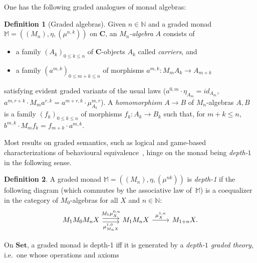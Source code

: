 \documentclass[11pt,a4paper]{amsart}
\theoremstyle{plain}
\newcommand{\id}{\mathit{id}}
\numberwithin{equation}{section}
\newcommand{\Nat}{{\mathbb{N}}}
\newcommand{\monad}{{\mathbb{M}}}
\newcommand{\Set}{\mathbf{Set}}
\newcommand{\+}[1]{\mathcal{#1}\xspace}
\newcommand{\BC}{\mathbf{C}}
\theoremstyle{definition}
\newtheorem{defn}[defn]{Definition}
\begin{document}
\noindent One has the following graded analogues of monad algebras:
\begin{defn}[Graded algebras]
  Given \(n \in \Nat\) and a graded monad
  \(\monad=((M_n), \eta, (\mu^{n, k}))\) on \(\BC\), an
  \emph{\(M_n\)-algebra} \(A\) consists of
    \begin{itemize}
        \item a family \((A_k)_{0 \le k \le n}\) of $\BC$-objects \(A_k\) called \emph{carriers}, and
        \item a family \((a^{m, k})_{0 \le m + k \le n}\) of morphisms \(a^{m, k}: M_m A_k \to A_{m + k}\)
    \end{itemize}
    satisfying evident graded variants of the usual laws
    (\(a^{0, m} \cdot \eta_{A_m} = \id_{A_m}\),
    \(a^{m, r + k} \cdot M_m a^{r, k} = a^{m + r, k} \cdot \mu^{m,
      r}_{A_k}\)).
    A \emph{homomorphism} $A\to B$ of \(M_n\)-algebras \(A, B\) is a
    family \((f_k)_{0 \le k \le n}\) of morphisms
    \(f_k\colon A_k \to B_k\) such that, for \(m + k \le n\),
    \(b^{m, k} \cdot M_m f_k = f_{m + k} \cdot a^{m, k}\).
\end{defn}
\noindent Most results on graded semantics, such as logical and
game-based characterizations of behavioural
equivalence~\cite{MiliusEA15,DorschEA19,FordEA22,ForsterEA25a,ForsterEA25b},
hinge on the monad being \emph{depth-$1$} in the following sense.
\begin{defn}\label{def:depth-1}
  A graded monad \(\monad=((M_n), \eta, (\mu^{nk}))\) is
  \emph{depth-1} if the following diagram (which commutes by the
  associative law of~$\monad$) is a coequalizer in the category of
  \(M_0\)-algebras for all \(X\) and \(n \in \Nat\):
  \begin{equation}
    \label{eq:depth-1}
    \begin{tikzcd}
      M_1 M_0 M_n X    \arrow[r,swap, "\mu^{1,0}_{M_n X }", shift right] \arrow[r, "M_1 \mu^{0,n}_X ", shift left] & M_1 M_n X   \arrow[r, "\mu^{1,n}_X"] & M_{1+n} X .
    \end{tikzcd}
  \end{equation}
\end{defn}
\noindent
On \(\Set\), a graded monad is depth-1 iff it is generated by a
\emph{depth-$1$ graded theory}, i.e.\ one whose operations and axioms
\end{document}
